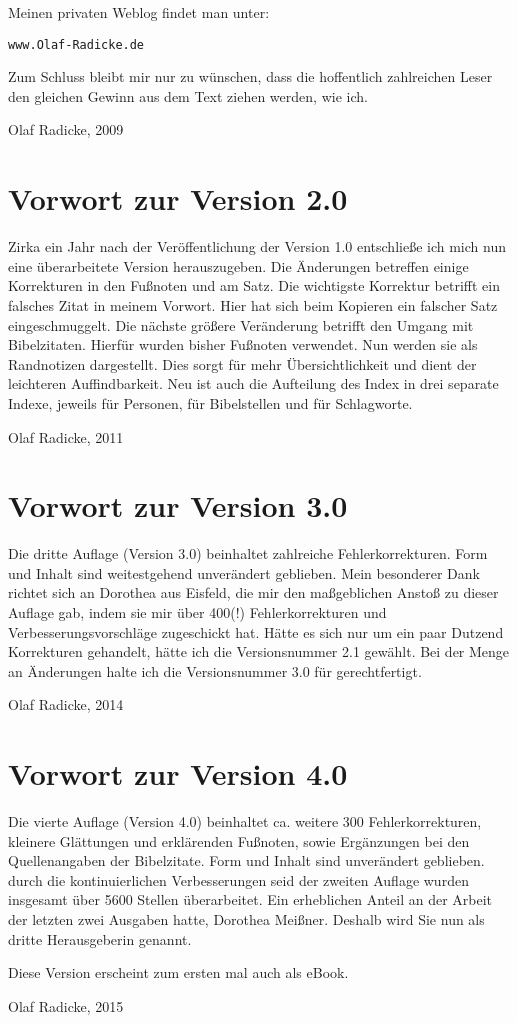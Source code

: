 Meinen privaten Weblog findet man unter:

\begin{center}
\texttt{www.Olaf-Radicke.de}
\end{center}

Zum Schluss bleibt mir nur zu wünschen, dass die hoffentlich zahlreichen Leser
den gleichen Gewinn aus dem Text ziehen werden, wie ich.

Olaf Radicke, 2009


\chapter{Vorwort zur Version 2.0}

Zirka ein Jahr nach der Veröffentlichung der Version 1.0 entschließe ich mich 
nun eine überarbeitete Version herauszugeben. Die Änderungen betreffen einige
Korrekturen in den Fußnoten und am Satz. Die wichtigste Korrektur betrifft ein 
falsches Zitat in meinem Vorwort. Hier hat sich beim Kopieren ein falscher Satz 
eingeschmuggelt. Die nächste größere Veränderung betrifft den Umgang mit
Bibelzitaten. Hierfür wurden bisher Fußnoten verwendet. Nun werden sie als
Randnotizen dargestellt. Dies sorgt für mehr Übersichtlichkeit 
und dient der leichteren Auffindbarkeit. Neu ist auch die Aufteilung des Index in 
drei separate Indexe, jeweils für Personen, für Bibelstellen und für Schlagworte.

Olaf Radicke, 2011


\chapter{Vorwort zur Version 3.0}

Die dritte Auflage (Version 3.0) beinhaltet zahlreiche Fehlerkorrekturen.
Form und Inhalt sind weitestgehend unverändert geblieben. Mein besonderer Dank 
richtet sich an Dorothea aus Eisfeld, die mir den maßgeblichen Anstoß zu dieser 
Auflage gab, indem sie mir über 400(!) Fehlerkorrekturen und Verbesserungsvorschläge 
zugeschickt hat. Hätte es sich nur um ein paar Dutzend Korrekturen gehandelt,
hätte ich die Versionsnummer 2.1 gewählt. Bei der Menge an Änderungen halte
ich die Versionsnummer 3.0 für gerechtfertigt.

Olaf Radicke, 2014


\chapter{Vorwort zur Version 4.0}

Die vierte Auflage (Version 4.0) beinhaltet ca. weitere 300 Fehlerkorrekturen, 
kleinere Glättungen und erklärenden Fußnoten, sowie Ergänzungen bei den Quellenangaben
der Bibelzitate. Form und Inhalt sind unverändert geblieben. durch die kontinuierlichen
Verbesserungen seid der zweiten Auflage wurden insgesamt über 5600 Stellen überarbeitet.
Ein erheblichen Anteil an der Arbeit der letzten zwei Ausgaben hatte, Dorothea Meißner.
Deshalb wird Sie nun als dritte Herausgeberin genannt. 


Diese Version
erscheint zum ersten mal auch als eBook.

Olaf Radicke, 2015